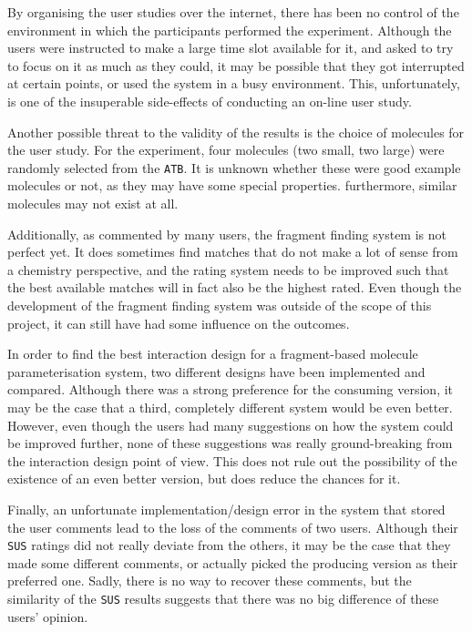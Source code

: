 By organising the user studies over the internet, there has been no control of the environment in which the participants performed the experiment. Although the users were instructed to make a large time slot available for it, and asked to try to focus on it as much as they could, it may be possible that they got interrupted at certain points, or used the system in a busy environment. This, unfortunately, is one of the insuperable side-effects of conducting an on-line user study.

Another possible threat to the validity of the results is the choice of molecules for the user study. For the experiment, four molecules (two small, two large) were randomly selected from the \verb|ATB|. It is unknown whether these were good example molecules or not, as they may have some special properties. furthermore, similar molecules may not exist at all.

Additionally, as commented by many users, the fragment finding system is not perfect yet. It does sometimes find matches that do not make a lot of sense from a chemistry perspective, and the rating system needs to be improved such that the best available matches will in fact also be the highest rated. Even though the development of the fragment finding system was outside of the scope of this project, it can still have had some influence on the outcomes.

In order to find the best interaction design for a fragment-based molecule parameterisation system, two different designs have been implemented and compared. Although there was a strong preference for the consuming version, it may be the case that a third, completely different system would be even better. However, even though the users had many suggestions on how the system could be improved further, none of these suggestions was really ground-breaking from the interaction design point of view. This does not rule out the possibility of the existence of an even better version, but does reduce the chances for it.

Finally, an unfortunate implementation/design error in the system that stored the user comments lead to the loss of the comments of two users. Although their \verb|SUS| ratings did not really deviate from the others, it may be the case that they made some different comments, or actually picked the producing version as their preferred one. Sadly, there is no way to recover these comments, but the similarity of the \verb|SUS| results suggests that there was no big difference of these users' opinion.


